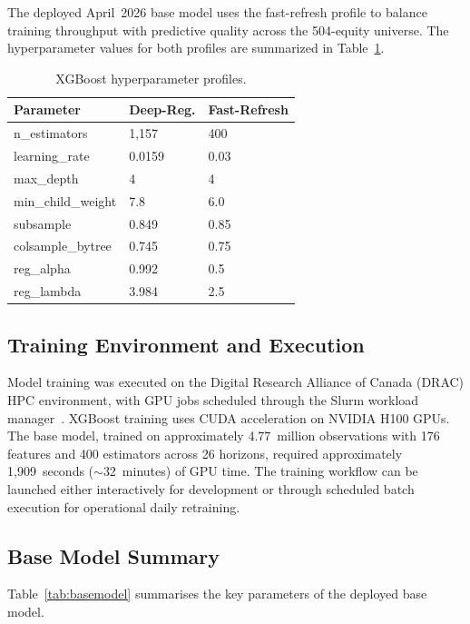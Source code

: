 \documentclass[conference]{IEEEtran}
\begin{document}
The deployed April~2026 base model uses the fast-refresh profile to balance training throughput with predictive quality across the 504-equity universe. The hyperparameter values for both profiles are summarized in Table~\ref{tab:hpo}.

\begin{table}[h]
\centering
\caption{XGBoost hyperparameter profiles.}
\label{tab:hpo}
\begin{tabular}{lll}
\hline
\textbf{Parameter}    & \textbf{Deep-Reg.} & \textbf{Fast-Refresh} \\
\hline
n\_estimators         & 1{,}157   & 400   \\
learning\_rate        & 0.0159    & 0.03  \\
max\_depth            & 4         & 4     \\
min\_child\_weight    & 7.8       & 6.0   \\
subsample             & 0.849     & 0.85  \\
colsample\_bytree     & 0.745     & 0.75  \\
reg\_alpha            & 0.992     & 0.5   \\
reg\_lambda           & 3.984     & 2.5   \\
\hline
\end{tabular}
\end{table}

\subsection{Training Environment and Execution}

Model training was executed on the Digital Research Alliance of Canada (DRAC) HPC environment, with GPU jobs scheduled through the Slurm workload manager~\cite{alliance_scheduler}. XGBoost training uses CUDA acceleration on NVIDIA H100 GPUs. The base model, trained on approximately 4.77~million observations with 176 features and 400 estimators across 26 horizons, required approximately 1{,}909~seconds ($\sim$32~minutes) of GPU time. The training workflow can be launched either interactively for development or through scheduled batch execution for operational daily retraining.

\subsection{Base Model Summary}

Table~\ref{tab:basemodel} summarises the key parameters of the deployed base model.
\end{document}
